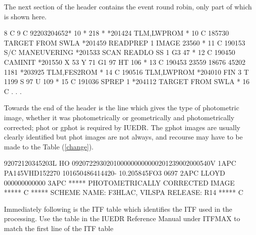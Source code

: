 \documentclass[11pt,twoside,nolof,noabs]{starlink}
\begin{document}
The next section of the header contains the event round robin, only part of
which is shown here.

\begin{terminalv}
                                                                     8  C
                                                                     9  C
 92203204652* 10  * 218 *        *201424 TLM,LWPROM               * 10  C
 185730 TARGET FROM SWLA         *201459 READPREP 1 IMAGE 23560   * 11  C
 190153 S/C MANEUVERING          *201533 SCAN READLO SS 1 G3 47   * 12  C
 190450 CAMINIT                  *201550 X 53 Y 71 G1 97 HT 106   * 13  C
 190453  23559 18676 45202 1181  *203925 TLM,FES2ROM              * 14  C
 190516 TLM,LWPROM               *204010 FIN 3 T 1199 S 97 U 109  * 15  C
 191036 SPREP 1                  *204112 TARGET FROM SWLA         * 16  C
.
.
.
\end{terminalv}

Towards the end of the header is the line which gives the type of photometric
image, whether it was
photometrically or geometrically and photometrically corrected; phot or gphot
is required by IUEDR.
The gphot images are usually clearly identified but phot
images are not always, and
recourse may have to be made to the Table (\ref{change}).

\begin{terminalv}
 92072120345203L HO 0920722930201000000000000201239002000540V        1APC
 PA145VHD152270            101650486414420- 10.205845FO3    0697     2APC
          LLOYD      000000000000                                    3APC
 ***** PHOTOMETRICALLY CORRECTED IMAGE *****                            C
 ***** SCHEME NAME:  F3HLAC, VILSPA RELEASE: R14 *****                  C
\end{terminalv}

Immediately following is the ITF table which identifies the ITF used in the
processing.
Use the table in the IUEDR Reference Manual under
ITFMAX to match the first line of the ITF table
\end{document}
